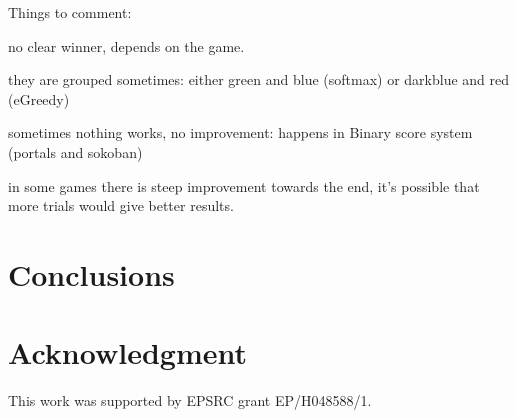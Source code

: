 \documentclass[conference]{IEEEtran}
\begin{document}
Things to comment:

no clear winner, depends on the game.

they are grouped sometimes: either green and blue (softmax) or darkblue and red (eGreedy)

sometimes nothing works, no improvement: happens in Binary score system (portals and sokoban)

in some games there is steep improvement towards the end, it's possible that more trials would give better results.


\section{Conclusions} \label{sec:conc}



 
\section*{Acknowledgment}


\noindent This work was supported by EPSRC grant EP/H048588/1.

 



\end{document}
